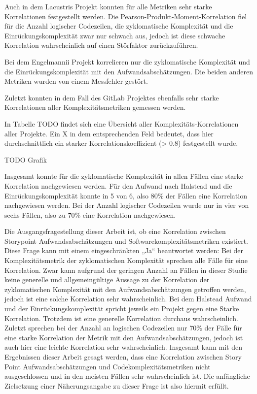 Auch in dem Lacustris Projekt konnten für alle Metriken
sehr starke Korrelationen festgestellt werden. Die
Pearson-Produkt-Moment-Korrelation fiel für die Anzahl logischer
Codezeilen, die zyklomatische Komplexität und die Einrückungskomplexität
zwar nur schwach aus, jedoch ist diese schwache Korrelation
wahrscheinlich auf einen Störfaktor zurückzuführen.

Bei dem Engelmannii Projekt korrelieren nur die zyklomatische Komplexität und die Einrückungskomplexität mit den
Aufwandsabschätzungen. Die beiden anderen Metriken wurden von einem
Messfehler gestört.

Zuletzt konnten in dem Fall des GitLab Projektes ebenfalls sehr starke
Korrelationen aller Komplexitätsmetriken gemessen werden.

In Tabelle TODO findet sich eine Übersicht aller
Komplexitäts-Korrelationen aller Projekte. Ein X in dem entsprechenden
Feld bedeutet, dass hier durchschnittlich ein starker
Korrelationskoeffizient (\textgreater{} 0.8) festgestellt wurde.

TODO Grafik

Insgesamt konnte für die zyklomatische Komplexität in allen Fällen eine
starke Korrelation nachgewiesen werden. Für den Aufwand nach Halstead
und die Einrückungskomplexität konnte in 5 von 6, also 80\% der Fällen
eine Korrelation nachgewiesen werden. Bei der Anzahl logischer
Codezeilen wurde nur in vier von sechs Fällen, also zu 70\% eine
Korrelation nachgewiesen.

Die Ausgangsfragestellung dieser Arbeit ist, ob eine Korrelation
zwischen 
Storypoint Aufwandsabschätzungen und
Softwarekomplexitätsmetriken existiert. Diese Frage kann mit einem
eingeschränkten „Ja`` beantwortet werden: Bei der Komplexitätsmetrik der
zyklomatischen Komplexität sprechen alle Fälle für eine Korrelation.
Zwar kann aufgrund der geringen Anzahl an Fällen in dieser Studie keine
generelle und allgemeingültige Aussage zu der Korrelation der
zyklomatischen Komplexität mit den Aufwandsabschätzungen getroffen
werden, jedoch ist eine solche Korrelation sehr wahrscheinlich. Bei dem
Halstead Aufwand und der Einrückungskomplexität spricht jeweils ein
Projekt gegen eine Starke Korrelation. Trotzdem ist eine generelle
Korrelation durchaus wahrscheinlich. Zuletzt sprechen bei der Anzahl an
logischen Codezeilen nur 70\% der Fälle für eine starke Korrelation der
Metrik mit den Aufwandsabschätzungen, jedoch ist auch hier eine leichte
Korrelation sehr wahrscheinlich. Insgesamt kann mit den Ergebnissen
dieser Arbeit gesagt werden, dass eine Korrelation zwischen Story Point
Aufwandsabschätzungen und Codekomplexitätsmetriken nicht ausgeschlossen
und in den meisten Fällen sehr wahrscheinlich ist. Die anfängliche
Zielsetzung einer Näherungsangabe zu dieser Frage ist also hiermit
erfüllt.